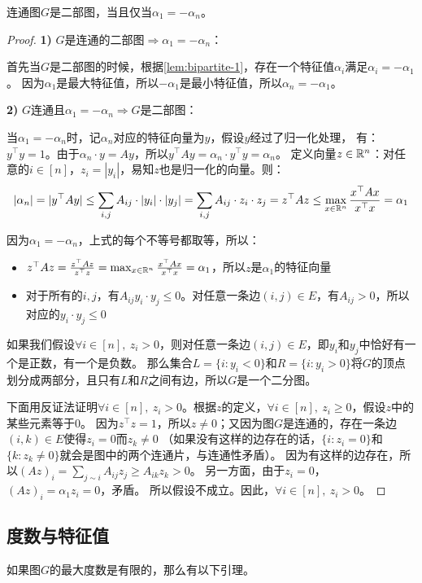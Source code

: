 \begin{lemma}
    连通图$G$是二部图，当且仅当$\alpha_1=-\alpha_n$。
\end{lemma}
\begin{proof}
    \textbf{1)} $G$是连通的二部图$\Rightarrow\alpha_1=-\alpha_n$：
    
    首先当$G$是二部图的时候，根据\cref{lem:bipartite-1}，存在一个特征值$\alpha_i$满足$\alpha_i=-\alpha_1$。
    因为$\alpha_1$是最大特征值，所以$-\alpha_1$是最小特征值，所以$\alpha_n=-\alpha_1$。

    \textbf{2)} $G$连通且$\alpha_1=-\alpha_n\Rightarrow G$是二部图：
    
    当$\alpha_1=-\alpha_n$时，记$\alpha_n$对应的特征向量为$y$，假设$y$经过了归一化处理，
    有：$y^\top y=1$。由于$\alpha_n\cdot y=Ay$，所以$y^\top Ay=\alpha_n\cdot y^\top y=\alpha_n$。
    定义向量$z\in\mathbb{R}^n$：对任意的$i\in[n]$，$z_i=|y_i|$，易知$z$也是归一化的向量。则：
    \[
    |\alpha_n|=|y^\top Ay|\le\sum_{i,j}A_{ij}\cdot|y_i|\cdot |y_j|
    =\sum_{i,j}A_{ij}\cdot z_i\cdot z_j
    =z^\top Az\le\max_{x\in\mathbb{R}^n}\frac{x^\top Ax}{x^\top x}=\alpha_1
    \]

    因为$\alpha_1=-\alpha_n$，上式的每个不等号都取等，所以：
    \begin{itemize}
        \item $z^\top Az=\frac{z^\top Az}{z^\top z}=\max_{x\in\mathbb{R}^n}\frac{x^\top Ax}{x^\top x}=\alpha_1$，所以$z$是$\alpha_1$的特征向量
        \item 对于所有的$i,j$，有$A_{ij}y_i\cdot y_j\le0$。对任意一条边$(i,j)\in E$，有$A_{ij}>0$，所以对应的$y_i\cdot y_j\le0$
    \end{itemize}

    如果我们假设$\forall i\in[n],\ z_i>0$，则对任意一条边$(i,j)\in E$，即$y_i$和$y_j$中恰好有一个是正数，有一个是负数。
    那么集合$L=\{i:y_i<0\}$和$R=\{i:y_i>0\}$将$G$的顶点划分成两部分，且只有$L$和$R$之间有边，所以$G$是一个二分图。

    下面用反证法证明$\forall i\in[n],\ z_i>0$。根据$z$的定义，$\forall i\in[n],\ z_i\ge0$，假设$z$中的某些元素等于0。
    因为$z^\top z=1$，所以$z\neq0$；又因为图$G$是连通的，存在一条边$(i,k)\in E$使得$z_i=0$而$z_k\neq0$
    （如果没有这样的边存在的话，$\{i:z_i=0\}$和$\{k:z_k\neq0\}$就会是图中的两个连通片，与连通性矛盾）。
    因为有这样的边存在，所以$(Az)_i=\sum_{j\sim i}A_{ij}z_j\ge A_{ik}z_k>0$。
    另一方面，由于$z_i=0$，$(Az)_i=\alpha_1 z_i=0$，矛盾。
    所以假设不成立。因此，$\forall i\in[n],\ z_i>0$。
\end{proof}
\subsection{度数与特征值}
\example 如果图$G$的最大度数是有限的，那么有以下引理。

